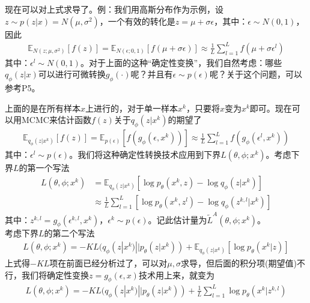             现在可以对上式求导了。例：我们用高斯分布作为示例，设$z\sim p(z|x) = N(\mu,\sigma^2)$，一个有效的转化是$z = \mu + \sigma \epsilon$，其中：$\epsilon \sim N(0,1)$，因此
            \begin{align*}
            \mathbb{E} _{N(z;\mu,\sigma^2)}[f(z)] = \mathbb{E}_{N(\epsilon;0,1)}[f(\mu+\sigma \epsilon)] \approx \frac{1}{L} \sum_{l=1}^L f(\mu+\sigma \epsilon^l)
            \end{align*}
            其中：$\epsilon^l \sim N(0,1) $。对于上面的这种“确定性变换”，我们自然考虑：哪些$q_\phi(z|x)$可以进行可微转换$g_\phi(\cdot)$呢？并且有$\epsilon \sim p(\epsilon)$呢？关于这个问题，可以参考\cite{2014.Kingma}P5。
            \par
            上面的是在所有样本$x$上进行的，对于单一样本$x^k$，只要将$x$变为$x^k$即可。现在可以用MCMC来估计函数$f(z)$关于$q_\phi(z|x^k)$的期望了
            \begin{align*}
            \mathbb{E} _{q_\phi(z|x^k)}[f(z)] = \mathbb{E}_{p(\epsilon)}[f(g_\phi(\epsilon,x^k))] \approx \frac{1}{L} \sum_{l=1}^L f(g_\phi(\epsilon^l,x^k))
            \end{align*}
            其中：$\epsilon^l\sim p(\epsilon)$。我们将这种确定性转换技术应用到下界$L(\theta,\phi;x^k)$。考虑下界$L$的第一个写法
            \begin{align*}
            L(\theta,\phi;x^k)& = \mathbb{E}_{q_\phi(z|x^k)} \left[ \log p_\theta(x^k,z) - \log q_\phi(z|x^k) \right]\\
            & \approx \frac{1}{L} \sum_{l=1}^L \left[ \log p_\theta(x^k,z^l) - \log q_\phi (z^{k,l}|x^k) \right]
            \end{align*}
            其中：$z^{k,l} = g_\phi(\epsilon^{k,l},x^k)$，$\epsilon ^k \sim p(\epsilon)$。记此估计量为$\tilde{L}^A(\theta,\phi;x^k)$。\\
            考虑下界$L$的第二个写法
            \begin{align*}
            L(\theta,\phi;x^k) = - KL(q_\phi(z|x^k)||p_\theta(z|x^k)) + \mathbb{E}_{q_\phi(z|x^k)} \left[ \log p_\theta(x^k|z) \right]
            \end{align*}
            上式得$-KL$项在前面已经分析过了，可以对$\mu,\sigma$求导，但后面的积分项(期望值)不行，我们将确定性变换$z = g_\phi(\epsilon,x)$技术用上来，就变为
            \begin{align*}
            L(\theta,\phi;x^k) = -KL(q_\phi(z|x^k) || p_\theta(z|x^k))+ \frac{1}{L}\sum_{l=1}^L \log p_\theta(x^k|z^{k,l})
            \end{align*}
